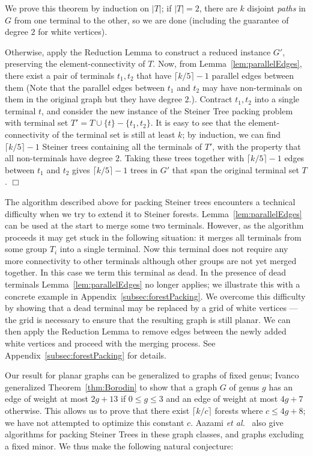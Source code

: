 \documentclass[11pt]{article}
\newcommand{\etal}{{\em et al.}\ }
\renewenvironment{proof}{\vspace{-0.1in}\noindent{\bf Proof:}}{\hspace*{\fill}$\Box$\par}
\def\ceil#1{\lceil {#1} \rceil}
\begin{document}
\begin{proof}
  We prove this theorem by induction on $|T|$; if $|T| = 2$, there are
  $k$ disjoint \emph{paths} in $G$ from one terminal to the other, so
  we are done (including the guarantee of degree $2$ for white
  vertices).

  Otherwise, apply the Reduction Lemma to construct a reduced instance
  $G'$, preserving the element-connectivity of $T$. Now, from
  Lemma~\ref{lem:parallelEdges}, there exist a pair of terminals $t_1,
  t_2$ that have $\ceil{k/5} - 1$ parallel edges between them (Note
  that the parallel edges between $t_1$ and $t_2$ may have
  non-terminals on them in the original graph but they have degree
  $2$.). Contract $t_1, t_2$ into a single terminal $t$, and consider
  the new instance of the Steiner Tree packing problem with terminal
  set $T' = T \cup \{t\} - \{t_1, t_2\}$. It is easy to see that the
  element-connectivity of the terminal set is still at least $k$; by
  induction, we can find $\ceil{k/5} - 1$ Steiner trees containing all
  the terminals of $T'$, with the property that all non-terminals have
  degree $2$. Taking these trees together with $\ceil{k/5} - 1$ edges
  between $t_1$ and $t_2$ gives $\ceil{k/5} - 1$ trees in $G'$ that
  span the original terminal set $T$.
\end{proof}

\smallskip
{} The
algorithm described above for packing Steiner trees encounters a
technical difficulty when we try to extend it to Steiner forests.
Lemma~\ref{lem:parallelEdges} can be used at the start to merge some
two terminals. However, as the algorithm proceeds it may get stuck in
the following situation: it merges all terminals from some group $T_i$
into a single terminal. Now this terminal does not require any more
connectivity to other terminals although other groups are not yet
merged together. In this case we term this terminal as dead. In the
presence of dead terminals Lemma~\ref{lem:parallelEdges} no longer
applies; we illustrate this with a concrete example in
Appendix~\ref{subsec:forestPacking}.  We overcome this difficulty by
showing that a dead terminal may be replaced by a grid of white
vertices --- the grid is necessary to ensure that the resulting graph
is still planar.  We can then apply the Reduction Lemma to remove
edges between the newly added white vertices and proceed with the
merging process. See Appendix~\ref{subsec:forestPacking} for details.


\smallskip
{} Our result for planar graphs can be
generalized to graphs of fixed genus; Ivanco \cite{Ivanco} generalized
Theorem~\ref{thm:Borodin} to show that a graph $G$ of genus $g$ has an
edge of weight at most $2g + 13$ if $0 \le g \le 3$ and an edge of
weight at most $4g + 7$ otherwise.  This allows us to prove that there
exist $\ceil{k/c}$ forests where $c \le 4g+8$; we have not attempted
to optimize this constant $c$.  Aazami \etal \cite{ACJ08} also give
algorithms for packing Steiner Trees in these graph classes, and
graphs excluding a fixed minor. We thus make the following natural
conjecture:
\end{document}
